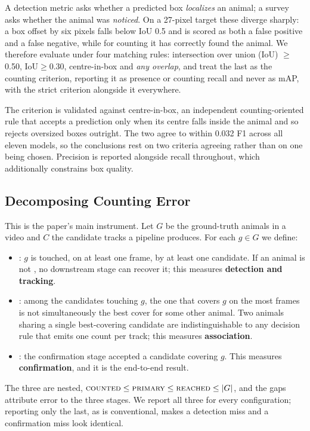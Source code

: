 A detection metric asks whether a predicted box \emph{localizes} an animal; a survey asks
whether the animal was \emph{noticed}. On a 27-pixel target these diverge sharply: a box
offset by six pixels falls below IoU 0.5 and is scored as both a false positive and a false
negative, while for counting it has correctly found the animal. We therefore evaluate under four matching rules: intersection over union (IoU) $\geq$0.50, IoU$\geq$0.30, centre-in-box and \emph{any overlap}, and treat the last as the counting criterion, reporting it as presence or counting recall
and never as mAP, with the strict criterion alongside it everywhere.

The criterion is validated against centre-in-box, an independent counting-oriented rule that
accepts a prediction only when its centre falls inside the animal and so rejects oversized
boxes outright. The two agree to within 0.032 F1 across all eleven models, so the
conclusions rest on two criteria agreeing rather than on one being chosen. Precision is
reported alongside recall throughout, which additionally constrains box quality.

\subsection{Decomposing Counting Error}
\label{sec:decomposition}

This is the paper's main instrument. Let $G$ be the ground-truth animals in a video and $C$
the candidate tracks a pipeline produces. For each $g\in G$ we define:

\begin{itemize}[leftmargin=*,labelsep=4.5mm]
\item \reachedq: $g$ is touched, on at least one frame, by at least one candidate. If
an animal is not \reachedq, no downstream stage can recover it; this measures
\textbf{detection and tracking}.
\item \primaryq: among the candidates touching $g$, the one that covers $g$ on the most
frames is not simultaneously the best cover for some other animal. Two animals sharing a
single best-covering candidate are indistinguishable to any decision rule that emits one
count per track; this measures \textbf{association}.
\item \countedq: the confirmation stage accepted a candidate covering $g$. This measures
\textbf{confirmation}, and it is the end-to-end result.
\end{itemize}

The three are nested, $\textsc{counted} \le \textsc{primary} \le \textsc{reached} \le |G|$, and the gaps
attribute error to the three stages. We report all three for every configuration; reporting
only the last, as is conventional, makes a detection miss and a confirmation miss look identical.


